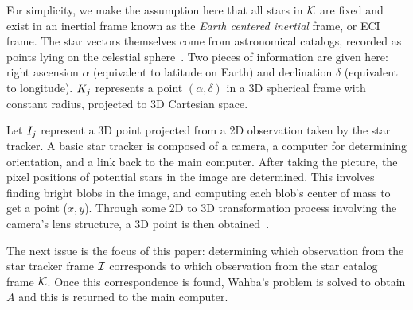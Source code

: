 For simplicity, we make the assumption here that all stars in $\mathcal{K}$ are fixed and exist in an inertial frame
known as the \textit{Earth centered inertial} frame, or ECI frame.
The star vectors themselves come from astronomical catalogs, recorded as points lying on the celestial
sphere~\cite{tappe:starTrackerDevelopment}.
Two pieces of information are given here: right ascension $\alpha$ (equivalent to latitude on Earth) and
declination $\delta$ (equivalent to longitude).
$K_j$ represents a point $\left( \alpha, \delta \right)$ in a 3D spherical frame with constant radius,
projected to 3D Cartesian space.

Let $I_j$ represent a 3D point projected from a 2D observation taken by the star tracker.
A basic star tracker is composed of a camera, a computer for determining orientation, and a link back to the main
computer.
After taking the picture, the pixel positions of potential stars in the image are determined.
This involves finding bright blobs in the image, and computing each blob's center of mass to get a point ($x, y$).
Through some 2D to 3D transformation process involving the camera's lens structure, a 3D point is then
obtained~\cite{tappe:starTrackerDevelopment}.

The next issue is the focus of this paper: determining which observation from the star tracker frame $\mathcal{I}$
corresponds to which observation from the star catalog frame $\mathcal{K}$.
Once this correspondence is found, Wahba's problem is solved to obtain $A$ and this is returned to the main computer.
